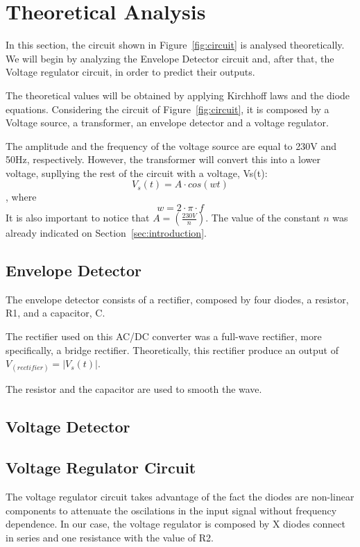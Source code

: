 \section{Theoretical Analysis}
\label{sec:analysis}

In this section, the circuit shown in Figure~\ref{fig:circuit} is analysed
theoretically. We will begin by analyzing the Envelope Detector circuit and, after that, the Voltage regulator circuit, in order to predict their outputs.

The theoretical values will be obtained by applying Kirchhoff laws and the diode equations.
Considering the circuit of Figure~\ref{fig:circuit}, it is composed by a Voltage source, a transformer, an envelope detector and a voltage regulator.

The amplitude and the frequency of the voltage source are equal to 230V and 50Hz, respectively. However, the transformer will convert this into a lower voltage, supllying the rest of the circuit with a voltage, Vs(t):
\begin{equation}
  V_s(t)= A \cdot cos(wt)
  \label{eq:Vs(t)}
\end{equation}
, where
\begin{equation}
  w= 2 \cdot \pi \cdot f
  \label{eq:Vs(t)}
\end{equation}
It is also important to notice that $A=(\frac{230V}{n})$. The value of the constant $n$ was already indicated on Section~\ref{sec:introduction}.

\subsection{Envelope Detector}
The envelope detector consists of a rectifier, composed by four diodes, a resistor, R1, and a capacitor, C.

The rectifier used on this AC/DC converter was a full-wave rectifier, more specifically, a bridge rectifier. Theoretically, this rectifier produce an output of $V_(rectifier)=|V_s(t)|$.

The resistor and the capacitor are used to smooth the wave.


\subsection{Voltage Detector}

\subsection{Voltage Regulator Circuit}
The voltage regulator circuit takes advantage of the fact the diodes are non-linear components to attenuate the oscilations in the input signal without frequency dependence. In our case, the voltage regulator is composed by X diodes connect in series and one resistance with the value of R2.\\

